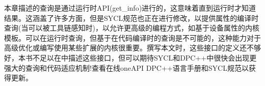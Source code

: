 本章描述的查询是通过运行时API(get\_info)进行的，这意味着直到运行时才知道结果。这涵盖了许多方面，但是SYCL规范也正在进行修改，以提供属性的编译时查询(当可以被工具链感知时)，以允许更高级的编程方式，如基于设备属性的内核模板。可以在运行时查询，但基于在代码编译时的查询是不可能的，这种能力对于高级优化或编写使用某些扩展的内核很重要。撰写本文时，这些接口的定义还不够好，本书不足以在中描述这些接口，但可以期待SYCL和DPC++中很快会出现更强大的查询和代码适应机制!查看在线oneAPI DPC++语言手册和SYCL规范以获得更新。\par